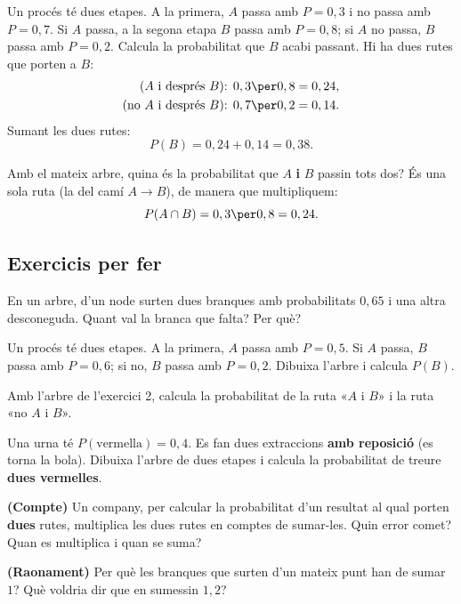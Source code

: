 \begin{exresolt}
Un procés té dues etapes. A la primera, $A$ passa amb $P=0,3$ i no passa amb $P=0,7$.
Si $A$ passa, a la segona etapa $B$ passa amb $P=0,8$; si $A$ no passa, $B$ passa amb
$P=0,2$. Calcula la probabilitat que $B$ acabi passant.
\solucio
Hi ha dues rutes que porten a $B$:
\[
\begin{aligned}
\text{($A$ i després $B$): } &0,3\per 0,8=0,24,\\
\text{(no $A$ i després $B$): } &0,7\per 0,2=0,14.
\end{aligned}
\]
Sumant les dues rutes:
\[
P(B)=0,24+0,14=0,38.
\]
\end{exresolt}

\begin{exresolt}
Amb el mateix arbre, quina és la probabilitat que $A$ \textbf{i} $B$ passin tots dos?
\solucio
És una sola ruta (la del camí $A\rightarrow B$), de manera que multipliquem:
\[
P(A\cap B)=0,3\per 0,8=0,24.
\]
\end{exresolt}

\subsection{Exercicis per fer}

\begin{exercicis}
\begin{exlist}
  \item En un arbre, d'un node surten dues branques amb probabilitats $0,65$ i una
        altra desconeguda. Quant val la branca que falta? Per què?
  \item Un procés té dues etapes. A la primera, $A$ passa amb $P=0,5$. Si $A$ passa, $B$
        passa amb $P=0,6$; si no, $B$ passa amb $P=0,2$. Dibuixa l'arbre i calcula
        $P(B)$.
  \item Amb l'arbre de l'exercici 2, calcula la probabilitat de la ruta «$A$ i $B$» i la
        ruta «no $A$ i $B$».
  \item Una urna té $P(\text{vermella})=0,4$. Es fan dues extraccions \textbf{amb
        reposició} (es torna la bola). Dibuixa l'arbre de dues etapes i calcula la
        probabilitat de treure \textbf{dues vermelles}.
  \item \textbf{(Compte)} Un company, per calcular la probabilitat d'un resultat al qual
        porten \textbf{dues} rutes, multiplica les dues rutes en comptes de sumar-les.
        Quin error comet? Quan es multiplica i quan se suma?
  \item \textbf{(Raonament)} Per què les branques que surten d'un mateix punt han de
        sumar $1$? Què voldria dir que en sumessin $1,2$?
\end{exlist}
\end{exercicis}

